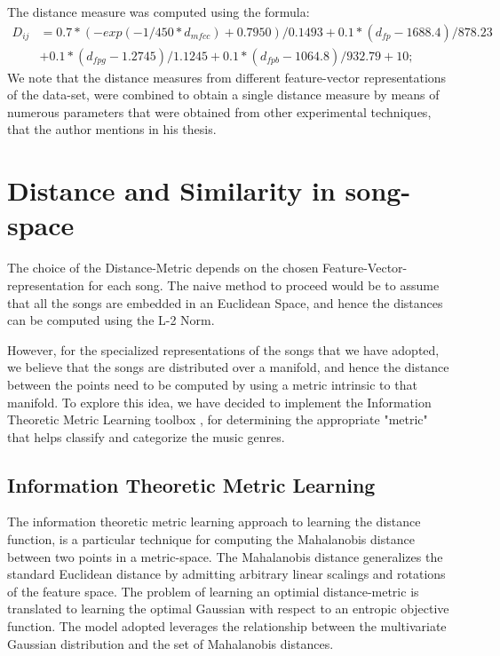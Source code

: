 \documentclass[10pt]{article}
\begin{document}
The distance measure was computed using the formula:
\begin{align*}
D_{ij} &= 0.7*(-exp(-1/450*d_{mfcc})+0.7950)/0.1493 + 0.1*(d_{fp}-1688.4)/878.23 \\
&+ 0.1*(d_{fpg}-1.2745)/1.1245 + 0.1*(d_{fpb}-1064.8)/932.79 + 10; 
\end{align*}
We note that the distance measures from different feature-vector representations of the data-set, were combined to obtain a single distance measure by means of numerous parameters that were obtained from other experimental techniques, that the author mentions in his thesis. 
    


\section{Distance and Similarity in song-space}

The choice of the Distance-Metric depends on the chosen Feature-Vector-representation for each song. The naive method to proceed would be to assume that all the songs are embedded in an Euclidean Space, and hence the distances can be computed using the L-2 Norm. 

However, for the specialized representations of the songs that we have adopted, we believe that the songs are distributed over a manifold, and hence the distance between the points need to be computed by using a metric intrinsic to that manifold. To explore this idea, we have decided to implement the Information Theoretic Metric Learning toolbox \cite{infoTheoryMetricLearning}, for determining the appropriate "metric" that helps classify and categorize the music genres. 

\subsection{Information Theoretic Metric Learning}

The information theoretic metric learning \cite{infoTheoryMetricLearning} approach to learning the distance function, is a particular technique for computing the Mahalanobis distance between two points in a metric-space. The Mahalanobis distance generalizes the standard Euclidean distance by admitting arbitrary linear scalings and rotations of the feature space. The problem of learning an optimial distance-metric is translated to learning the optimal Gaussian with respect to an entropic objective function. The model adopted leverages the relationship between the multivariate Gaussian distribution and the set of Mahalanobis distances. 
\end{document}

